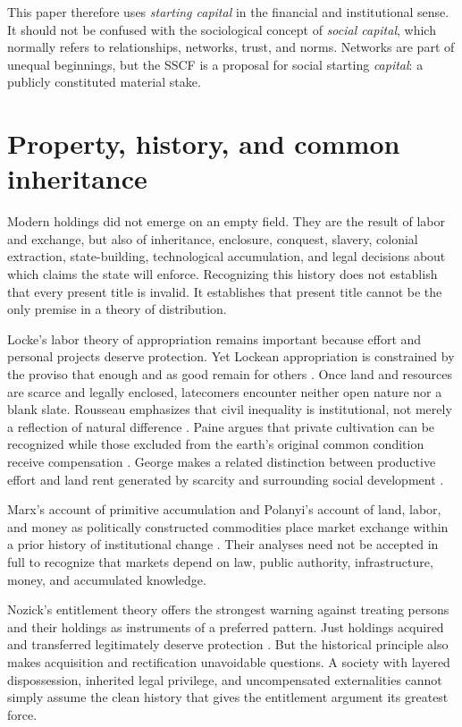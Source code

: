 \documentclass[11pt]{article}
\begin{document}
This paper therefore uses \emph{starting capital} in the financial and institutional
sense. It should not be confused with the sociological concept of \emph{social capital},
which normally refers to relationships, networks, trust, and norms. Networks are part
of unequal beginnings, but the SSCF is a proposal for social starting \emph{capital}:
a publicly constituted material stake.

\section{Property, history, and common inheritance}

Modern holdings did not emerge on an empty field. They are the result of labor and
exchange, but also of inheritance, enclosure, conquest, slavery, colonial extraction,
state-building, technological accumulation, and legal decisions about which claims the
state will enforce. Recognizing this history does not establish that every present title
is invalid. It establishes that present title cannot be the only premise in a theory of
distribution.

Locke's labor theory of appropriation remains important because effort and personal
projects deserve protection. Yet Lockean appropriation is constrained by the proviso
that enough and as good remain for others \cite{locke1689}. Once land and resources are
scarce and legally enclosed, latecomers encounter neither open nature nor a blank slate.
Rousseau emphasizes that civil inequality is institutional, not merely a reflection of
natural difference \cite{rousseau1755}. Paine argues that private cultivation can be
recognized while those excluded from the earth's original common condition receive
compensation \cite{paine1797}. George makes a related distinction between productive
effort and land rent generated by scarcity and surrounding social development
\cite{george1879}.

Marx's account of primitive accumulation and Polanyi's account of land, labor, and
money as politically constructed commodities place market exchange within a prior
history of institutional change \cite{marx1867,polanyi1944}. Their analyses need not
be accepted in full to recognize that markets depend on law, public authority,
infrastructure, money, and accumulated knowledge.

Nozick's entitlement theory offers the strongest warning against treating persons and
their holdings as instruments of a preferred pattern. Just holdings acquired and
transferred legitimately deserve protection \cite{nozick1974}. But the historical
principle also makes acquisition and rectification unavoidable questions. A society
with layered dispossession, inherited legal privilege, and uncompensated externalities
cannot simply assume the clean history that gives the entitlement argument its greatest
force.
\end{document}

